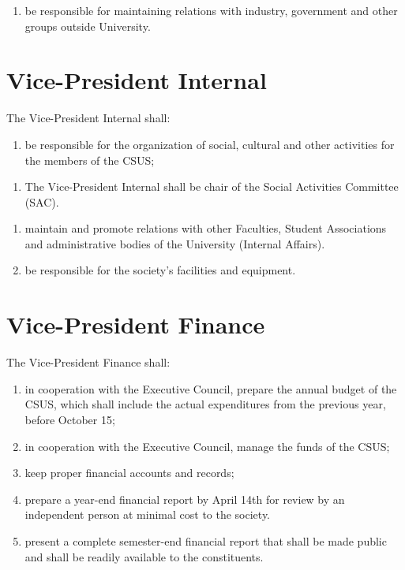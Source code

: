 \begin{enumerate}
\def\labelenumi{\arabic{enumi}.}
\setcounter{enumi}{3}
\tightlist
\item
  be responsible for maintaining relations with industry, government and
  other groups outside University.
\end{enumerate}

\section{Vice-President
Internal}\label{vice-president-internal}

The Vice-President Internal shall:

\begin{enumerate}
\def\labelenumi{\arabic{enumi}.}
\tightlist
\item
  be responsible for the organization of social, cultural and other
  activities for the members of the CSUS;
\end{enumerate}

\begin{enumerate}
\def\labelenumi{(\alph{enumi})}
\tightlist
\item
  The Vice-President Internal shall be chair of the Social Activities
  Committee (SAC).
\end{enumerate}

\begin{enumerate}
\def\labelenumi{\arabic{enumi}.}
\setcounter{enumi}{1}
\item
  maintain and promote relations with other Faculties, Student
  Associations and administrative bodies of the University (Internal
  Affairs).
\item
  be responsible for the society's facilities and equipment.
\end{enumerate}

\section{Vice-President Finance}\label{vice-president-finance}

The Vice-President Finance shall:

\begin{enumerate}
\def\labelenumi{\arabic{enumi}.}
\item
  in cooperation with the Executive Council, prepare the annual budget
  of the CSUS, which shall include the actual expenditures from the
  previous year, before October 15;
\item
  in cooperation with the Executive Council, manage the funds of the
  CSUS;
\item
  keep proper financial accounts and records;
\item
  prepare a year-end financial report by April 14th for review by an
  independent person at minimal cost to the society.
\item
  present a complete semester-end financial report that shall be made
  public and shall be readily available to the constituents.
\end{enumerate}

